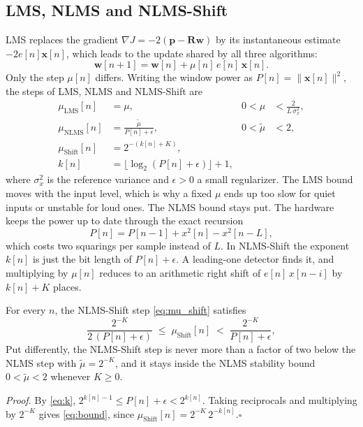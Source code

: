 \subsection{LMS, NLMS and NLMS-Shift}
LMS replaces the gradient $\nabla J=-2(\mathbf{p}-\mathbf{R}\mathbf{w})$ by its instantaneous estimate
$-2e[n]\mathbf{x}[n]$, which leads to the update shared by all three algorithms:
\begin{equation}
\mathbf{w}[n+1]=\mathbf{w}[n]+\mu[n]\,e[n]\,\mathbf{x}[n].
\label{eq:upd}
\end{equation}
Only the step $\mu[n]$ differs. Writing the window power as $P[n]=\|\mathbf{x}[n]\|^2$, the steps of LMS,
NLMS and NLMS-Shift are
\begin{align}
\mu_{\text{LMS}}[n] &= \mu, & 0<\mu&<\frac{2}{L\,\sigma_x^2}, \label{eq:mu_lms}\\
\mu_{\text{NLMS}}[n] &= \frac{\tilde\mu}{P[n]+\epsilon}, & 0<\tilde\mu&<2, \label{eq:mu_nlms}\\
\mu_{\text{Shift}}[n] &= 2^{-(k[n]+K)}, && \label{eq:mu_shift}\\
k[n] &= \lfloor\log_2(P[n]+\epsilon)\rfloor+1, && \label{eq:k}
\end{align}
where $\sigma_x^2$ is the reference variance and $\epsilon>0$ a small regularizer. The LMS bound moves
with the input level, which is why a fixed $\mu$ ends up too slow for quiet inputs or unstable for loud
ones. The NLMS bound stays put. The hardware keeps the power up to date through the exact recursion
\begin{equation}
P[n] = P[n-1] + x^2[n] - x^2[n-L],
\label{eq:prec}
\end{equation}
which costs two squarings per sample instead of $L$. In NLMS-Shift the exponent $k[n]$ is just the bit
length of $P[n]+\epsilon$. A leading-one detector finds it, and multiplying by $\mu[n]$ reduces to an
arithmetic right shift of $e[n]\,x[n-i]$ by $k[n]+K$ places.

\begin{proposition}\label{prop:bound}
For every $n$, the NLMS-Shift step \eqref{eq:mu_shift} satisfies
\begin{equation}
\frac{2^{-K}}{2\,(P[n]+\epsilon)} \;\le\; \mu_{\text{Shift}}[n] \;<\; \frac{2^{-K}}{P[n]+\epsilon},
\label{eq:bound}
\end{equation}
Put differently, the NLMS-Shift step is never more than a factor of two below the NLMS step with
$\tilde\mu=2^{-K}$, and it stays inside the NLMS stability bound $0<\tilde\mu<2$ whenever $K\ge0$.
\end{proposition}
\noindent\emph{Proof.} By \eqref{eq:k}, $2^{k[n]-1}\le P[n]+\epsilon<2^{k[n]}$. Taking reciprocals and
multiplying by $2^{-K}$ gives \eqref{eq:bound}, since $\mu_{\text{Shift}}[n]=2^{-K}\,2^{-k[n]}$.\hfill$\square$

